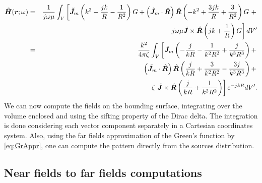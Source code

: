 \begin{eqnarray}
\label{eq:KottlerHdirect}
\tilde{\mbfit{H}}(\mbfit{r}; \omega) &= & \frac{1}{j \omega \mu} \int_V \left [ \tilde{\mbfit{J}}_m \left ( k^2 - \frac{jk}{R} - \frac{1}{R^2} \right ) G + \left ( \tilde{\mbfit{J}}_m \cdot \hat{\mbfit{R}} \right ) \hat{\mbfit{R}} \left (- k^2 + \frac{3jk}{R} + \frac{3}{R^2} \right) G \ + \right. \nonumber \\
& & \hspace{.5cm} \left. j \omega \mu \tilde{\mbfit{J}}  \times \hat{\mbfit{R}} \left ( jk + \frac{1}{R} \right ) G \right ] dV' \nonumber \\
&= & \frac{k^2}{4 \pi \zeta} \int_V \left [ \tilde{\mbfit{J}}_m \left ( - \frac{j}{kR} - \frac{1}{k^2R^2} + \frac{j}{k^3R^3} \right ) + \right. \nonumber \\
& & \hspace{.5cm} \left. \left ( \tilde{\mbfit{J}}_m \cdot \hat{\mbfit{R}} \right ) \hat{\mbfit{R}} \left (\frac{j}{kR} + \frac{3}{k^2R^2} - \frac{3j}{k^3R^3} \right) + \right. \nonumber \\
& & \hspace{1cm} \left. \zeta \ \tilde{\mbfit{J}}  \times \hat{\mbfit{R}} \left ( \frac{j}{kR} + \frac{1}{k^2R^2} \right ) \right ] \mrm{e}^{-jkR}  dV'.
\end{eqnarray}
We can now compute the fields on the bounding surface, integrating over the volume enclosed and using the sifting property of the Dirac delta. The integration is done considering each vector component separately in a Cartesian coordinates system. Also, using the far fields approximation of the Green's function by \eqref{eq:GrAppr}, one can compute the pattern directly from the sources distribution.

\subsection{Near fields to far fields computations}

